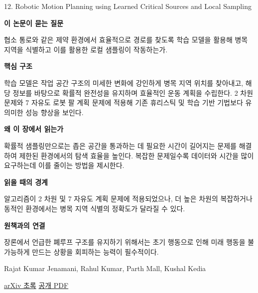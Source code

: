 \documentclass[11pt,openany]{book}
\begin{document}
\begin{termcard}{12. Robotic Motion Planning using Learned Critical Sources and Local Sampling}

\par

\medskip

{\sffamily\bfseries\color{deepblue} 이 논문이 묻는 질문}\par

협소 통로와 같은 제약 환경에서 효율적으로 경로를 찾도록 학습 모델을 활용해 병목 지역을 식별하고 이를 활용한 로컬 샘플링이 작동하는가.

\smallskip

{\sffamily\bfseries\color{deepblue} 핵심 구조}\par

학습 모델은 작업 공간 구조의 미세한 변화에 강인하게 병목 지역 위치를 찾아내고, 해당 정보를 바탕으로 확률적 완전성을 유지하며 효율적인 운동 계획을 수립한다. 2 차원 문제와 7 자유도 로봇 팔 계획 문제에 적용해 기존 휴리스틱 및 학습 기반 기법보다 유의미한 성능 향상을 보인다.

\smallskip

{\sffamily\bfseries\color{deepblue} 왜 이 장에서 읽는가}\par

확률적 샘플링만으로는 좁은 공간을 통과하는 데 필요한 시간이 길어지는 문제를 해결하여 제한된 환경에서의 탐색 효율을 높인다. 복잡한 문제일수록 데이터와 시간을 많이 요구하는데 이를 줄이는 방법을 제시한다.

\smallskip

{\sffamily\bfseries\color{coral} 읽을 때의 경계}\par

알고리즘이 2 차원 및 7 자유도 계획 문제에 적용되었으나, 더 높은 차원의 복잡하거나 동적인 환경에서는 병목 지역 식별의 정확도가 달라질 수 있다.

\smallskip

{\sffamily\bfseries\color{teal} 원책과의 연결}\par

장론에서 언급한 폐루프 구조를 유지하기 위해서는 초기 행동으로 인해 미래 행동을 불가능하게 만드는 상황을 회피하는 능력이 필수적이다.

\medskip

{\footnotesize\color{muted} Rajat Kumar Jenamani, Rahul Kumar, Parth Mall, Kushal Kedia\par

\href{https://arxiv.org/abs/2006.04194}{arXiv 초록} \quad \href{https://arxiv.org/pdf/2006.04194}{공개 PDF}\par}

\end{termcard}
\end{document}
